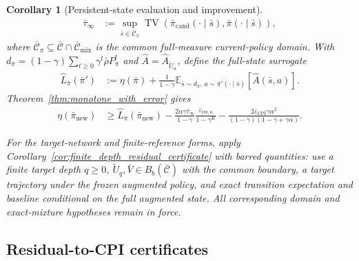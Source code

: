 \documentclass{article}
\theoremstyle{plain}
\newtheorem{corollary}[theorem]{Corollary}
\theoremstyle{definition}
\theoremstyle{remark}
\newcommand{\E}{\mathbb{E}}
\begin{document}
\begin{corollary}[Persistent-state evaluation and improvement]
\begin{align}
\bar\tau_\infty
&:=\sup_{\bar s\in\bar{\mathcal C}_\pi}
\operatorname{TV}(\bar\pi_{\mathrm{cand}}(\cdot\mid\bar s),
\bar\pi(\cdot\mid\bar s)),
\end{align}
where
$\bar{\mathcal C}_\pi\subseteq
\bar{\mathcal C}\cap\bar{\mathcal C}_{\mathrm{mix}}$
is the common full-measure current-policy domain. With $d_{\bar\pi}=(1-\gamma)\sum_{t\ge0}\gamma^t\bar\rho P_{\bar\pi}^t$
and $\widehat A=\widehat A_{\widetilde U_n}$, define the full-state surrogate
\begin{align}
\widehat L_{\bar\pi}(\bar\pi')
&:=\eta(\bar\pi)+\frac{1}{1-\gamma}
\E_{\bar s\sim d_{\bar\pi},\,a\sim\bar\pi'(\cdot\mid\bar s)}[\widehat A(\bar s,a)].
\label{eq:persistent_surrogate}
\end{align}
Theorem~\ref{thm:monotone_with_error} gives
\begin{align}
\eta(\bar\pi_{\mathrm{new}})
&\ge \widehat L_{\bar\pi}(\bar\pi_{\mathrm{new}})
-\frac{2\alpha\gamma\bar\tau_\infty}{1-\gamma}
\frac{\bar\varepsilon_{\mathrm{res},n}}{1-\gamma^K}
-\frac{2\bar\varepsilon_{\mathrm{CPI}}\gamma\alpha^2}
{(1-\gamma)(1-\gamma+\gamma\alpha)}.
\label{eq:persistent_augmented_cpi}
\end{align}

For the target-network and finite-reference forms, apply
Corollary~\ref{cor:finite_depth_residual_certificate} with barred quantities:
use a finite target depth $q\ge0$, $\widetilde U_q,\bar V\in B_b(\bar{\mathcal C})$
with the common boundary, a target trajectory under the frozen augmented policy, and exact
transition expectation and baseline conditional on the full augmented state.
All corresponding domain and exact-mixture hypotheses remain in force.
\end{corollary}

\subsection{Residual-to-CPI certificates}
\label{app:proof_finite_depth_certificate}
\end{document}
